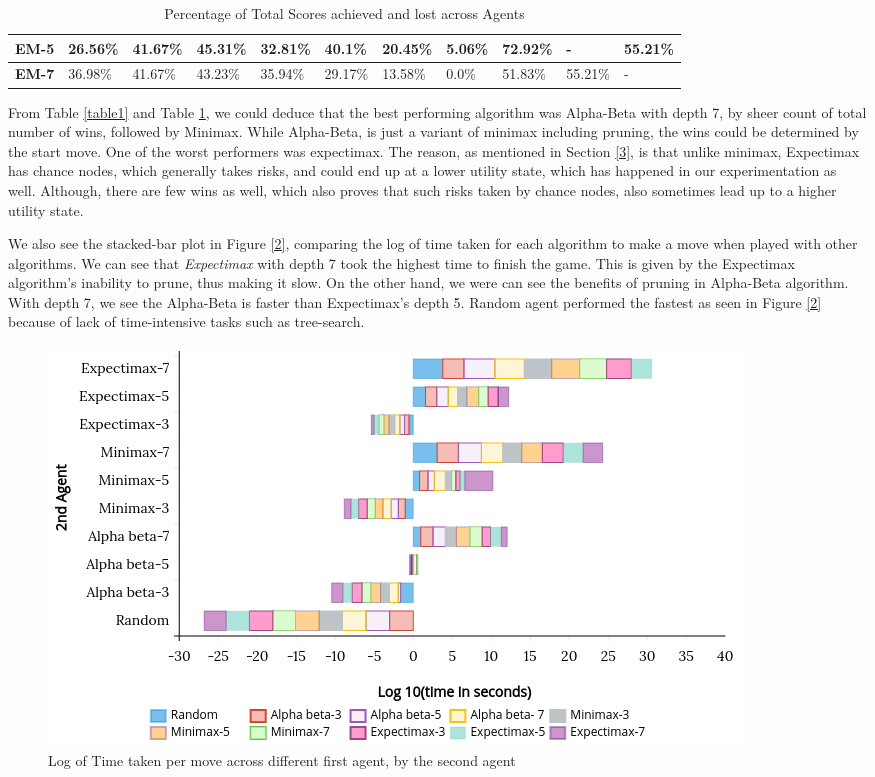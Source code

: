 \documentclass{svproc}
\begin{document}
\begin{table}[H]
{\begin{tabular}{|l|l|l|l|l|l|l|l|l|l|l|}
\textbf{EM-5} & 26.56\%         & 41.67\%               & 45.31\%               & 32.81\%               & 40.1\%             & 20.45\%            & 5.06\%             & 72.92\%               & -                     & 55.21\%               \\ \hline
\textbf{EM-7} & 36.98\%         & 41.67\%               & 43.23\%               & 35.94\%               & 29.17\%            & 13.58\%            & 0.0\%              & 51.83\%               & 55.21\%               & -                     \\ \hline
\end{tabular}%
}

\caption{Percentage of Total Scores achieved and lost across Agents}
\label{table2}
\end{table}

From Table \ref{table1} and Table \ref{table2}, we could deduce that the best performing algorithm was Alpha-Beta with depth 7, by sheer count of total number of wins, followed by Minimax. While Alpha-Beta, is just a variant of minimax including pruning, the wins could be determined by the start move. One of the worst performers was expectimax. The reason, as mentioned in Section \ref{3}, is that unlike minimax, Expectimax has chance nodes, which generally takes risks, and could end up at a lower utility state, which has happened in our experimentation as well. Although, there are few wins as well, which also proves that such risks taken by chance nodes, also sometimes lead up to a higher utility state.

We also see the stacked-bar plot in Figure \ref{2}, comparing the log of time taken for each algorithm to make a move when played with other algorithms. We can see that \emph{Expectimax} with depth 7 took the highest time to finish the game. This is given by the Expectimax algorithm's inability to prune, thus making it slow. On the other hand, we were can see the benefits of pruning in Alpha-Beta algorithm. With depth 7, we see the Alpha-Beta is faster than Expectimax's depth 5. Random agent performed the fastest as seen in Figure \ref{2} because of lack of time-intensive tasks such as tree-search.

\begin{figure}
    \centering
    \includegraphics[scale=0.49]{img2.png}
    \caption{Log of Time taken per move across different first agent, by the second agent}
    \label{figure2}
\end{figure}
\end{document}
